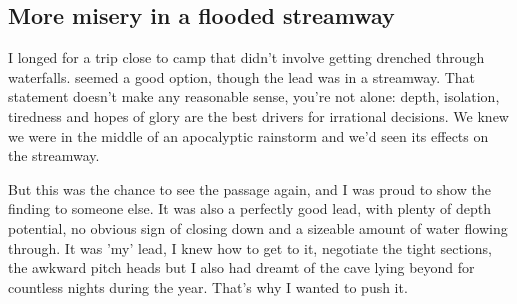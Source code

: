 \subsection{More misery in a flooded streamway}
\begin{marginfigure}
\end{marginfigure}
I longed for a trip close to camp that didn't involve getting drenched through waterfalls.  seemed a good option, though the lead was in a streamway. That statement doesn't make any reasonable sense, you're not alone: depth, isolation, tiredness and hopes of glory are the best drivers for irrational decisions. We knew we were in the middle of an apocalyptic rainstorm and we'd seen its effects on the  streamway. 

But this was the chance to see the passage again, and I was proud to show the finding to someone else. It was also a perfectly good lead, with plenty of depth potential, no obvious sign of closing down and a sizeable amount of water flowing through. It was 'my' lead, I knew how to get to it, negotiate the tight sections, the awkward pitch heads but I also had dreamt of the cave lying beyond for countless nights during the year. That's why I wanted to push it.
